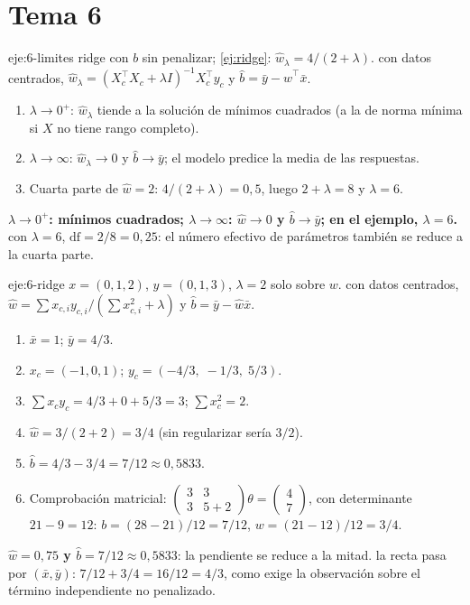 \section{Tema 6}

\begin{solucion}{eje:6-limites}
\datos ridge con $b$ sin penalizar; \cref{ej:ridge}: $\hat w_\lambda=4/(2+\lambda)$.
\planteamiento con datos centrados, $\hat w_\lambda=(X_c^{\top}X_c+\lambda I)^{-1}X_c^{\top}y_c$ y $\hat b=\bar y-\hat w^{\top}\bar x$.
\pasos
\begin{enumerate}[label=\arabic*.]
  \item $\lambda\to 0^{+}$: $\hat w_\lambda$ tiende a la solución de mínimos cuadrados (a la de norma mínima si $X$ no tiene rango completo).
  \item $\lambda\to\infty$: $\hat w_\lambda\to 0$ y $\hat b\to\bar y$; el modelo predice la media de las respuestas.
  \item Cuarta parte de $\hat w=2$: $4/(2+\lambda)=0{,}5$, luego $2+\lambda=8$ y $\lambda=6$.
\end{enumerate}
\resultado \textbf{$\lambda\to 0^{+}$: mínimos cuadrados; $\lambda\to\infty$: $\hat w\to 0$ y $\hat b\to\bar y$; en el ejemplo, $\lambda=6$.}
\comprobacion con $\lambda=6$, $\mathrm{df}=2/8=0{,}25$: el número efectivo de parámetros también se reduce a la cuarta parte.
\end{solucion}

\begin{solucion}{eje:6-ridge}
\datos $x=(0,1,2)$, $y=(0,1,3)$, $\lambda=2$ solo sobre $w$.
\planteamiento con datos centrados, $\hat w=\sum x_{c,i}y_{c,i}/(\sum x_{c,i}^{2}+\lambda)$ y $\hat b=\bar y-\hat w\bar x$.
\pasos
\begin{enumerate}[label=\arabic*.]
  \item $\bar x=1$; $\bar y=4/3$.
  \item $x_c=(-1,0,1)$; $y_c=(-4/3,\;-1/3,\;5/3)$.
  \item $\sum x_cy_c=4/3+0+5/3=3$; $\sum x_c^{2}=2$.
  \item $\hat w=3/(2+2)=3/4$ (sin regularizar sería $3/2$).
  \item $\hat b=4/3-3/4=7/12\approx 0{,}5833$.
  \item Comprobación matricial: $\begin{pmatrix}3&3\\3&5+2\end{pmatrix}\theta=\begin{pmatrix}4\\7\end{pmatrix}$, con determinante $21-9=12$: $b=(28-21)/12=7/12$, $w=(21-12)/12=3/4$.
\end{enumerate}
\resultado \textbf{$\hat w=0{,}75$ y $\hat b=7/12\approx 0{,}5833$}: la pendiente se reduce a la mitad.
\comprobacion la recta pasa por $(\bar x,\bar y)$: $7/12+3/4=16/12=4/3$, como exige la observación sobre el término independiente no penalizado.
\end{solucion}

